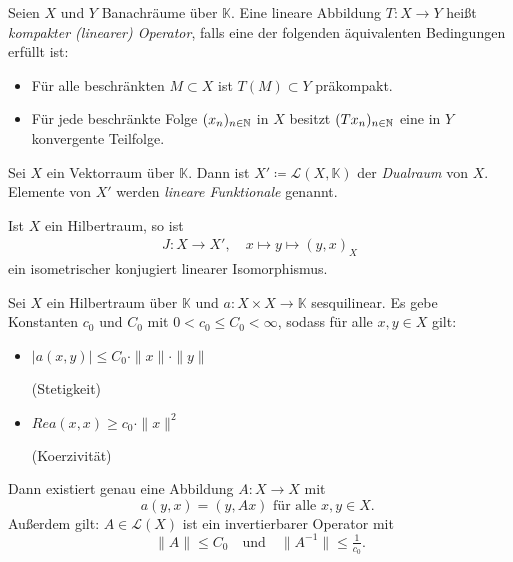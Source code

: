 \documentclass{cheat-sheet}
\newcommand{\K}{\mathbb{K}}
\begin{document}
\begin{defn}
  Seien $X$ und $Y$ Banachräume über $\K$. Eine lineare Abbildung $T : X \to Y$ heißt \emph{kompakter (linearer) Operator}, falls eine der folgenden äquivalenten Bedingungen erfüllt ist:
  \begin{itemize}
    \item Für alle beschränkten $M \subset X$ ist $T(M) \subset Y$ präkompakt.
    \item Für jede beschränkte Folge $(x_n)_{n \in \mathbb{N}}$ in $X$ besitzt $(T x_n)_{n \in \mathbb{N}}$ eine in $Y$ konvergente Teilfolge.
  \end{itemize}
\end{defn}

\begin{defn}
  Sei $X$ ein Vektorraum über $\K$. Dann ist $X' \coloneqq \mathcal{L}(X, \K)$ der \emph{Dualraum} von $X$. Elemente von $X'$ werden \emph{lineare Funktionale} genannt.
\end{defn}

\begin{satz}
  Ist $X$ ein Hilbertraum, so ist
  \begin{align*}
    J : X \to X', \quad x \mapsto y \mapsto (y, x)_X
  \end{align*}
  ein isometrischer konjugiert linearer Isomorphismus.
\end{satz}

\begin{satz}
  Sei $X$ ein Hilbertraum über $\K$ und $a : X \times X \to \K$ sesquilinear. Es gebe Konstanten $c_0$ und $C_0$ mit $0 < c_0 \leq C_0 < \infty$, sodass für alle $x, y \in X$ gilt:
  \begin{itemize}
    \item $\left| a(x, y) \right| \leq C_0 \cdot \|x\| \cdot \|y\|$ {\raggedright (Stetigkeit)}
    \item $Re a(x, x) \geq c_0 \cdot \|x\|^2$ {\raggedright (Koerzivität)}
  \end{itemize}
  Dann existiert genau eine Abbildung $A : X \to X$ mit
  \[ a(y, x) = (y, Ax) \text{ für alle $x, y \in X$. } \]
  Außerdem gilt: $A \in \mathcal{L}(X)$ ist ein invertierbarer Operator mit
  \[ \|A\| \leq C_0 \quad \text{und} \quad \|A^{-1}\| \leq \tfrac{1}{c_0}. \]
\end{satz}
\end{document}
